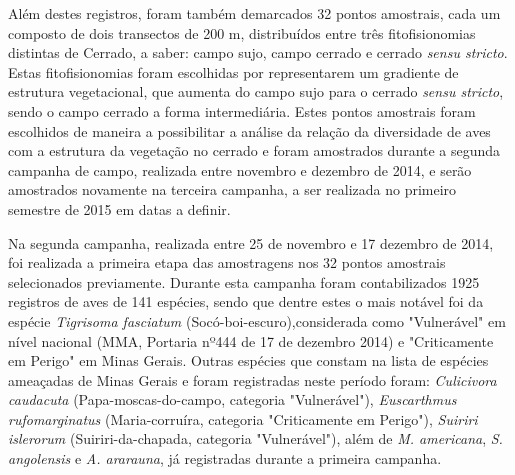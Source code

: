Além destes registros, foram também demarcados 32 pontos amostrais,
cada um composto de dois transectos de 200 m, distribuídos entre três
fitofisionomias distintas de Cerrado, a saber: campo sujo, campo
cerrado e cerrado \textit{sensu stricto}. Estas fitofisionomias foram
escolhidas por representarem um gradiente de estrutura vegetacional,
que aumenta do campo sujo para o cerrado \textit{sensu stricto}, sendo
o campo cerrado a forma intermediária. Estes pontos amostrais foram
escolhidos de maneira a possibilitar a análise da relação da
diversidade de aves com a estrutura da vegetação no cerrado e foram
amostrados durante a segunda campanha de campo, realizada entre
novembro e dezembro de 2014, e serão amostrados novamente na terceira
campanha, a ser realizada no primeiro semestre de 2015 em datas a
definir.

Na segunda campanha, realizada entre 25 de novembro e 17 dezembro de
2014, foi realizada a primeira etapa das amostragens nos 32 pontos
amostrais selecionados previamente. Durante esta campanha foram
contabilizados 1925 registros de aves de 141 espécies, sendo que
dentre estes o mais notável foi da espécie \textit{Tigrisoma fasciatum}
(Socó-boi-escuro),considerada como "Vulnerável" em nível nacional
(MMA, Portaria nº444 de 17 de dezembro 2014) e "Criticamente em
Perigo" em Minas Gerais. Outras espécies que constam na lista de
espécies ameaçadas de Minas Gerais e foram registradas neste período
foram: \textit{Culicivora caudacuta} (Papa-moscas-do-campo, categoria
"Vulnerável"), \textit{Euscarthmus rufomarginatus} (Maria-corruíra,
categoria "Criticamente em Perigo"), \textit{Suiriri islerorum}
(Suiriri-da-chapada, categoria "Vulnerável"), além de
\textit{M. americana}, \textit{S. angolensis} e \textit{A. ararauna},
já registradas durante a primeira campanha.

